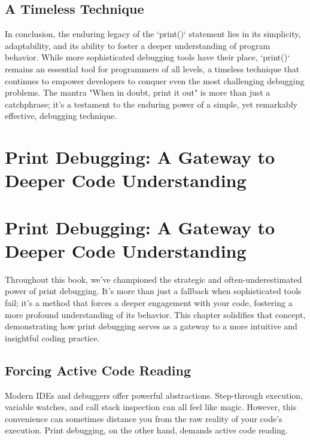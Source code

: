 \documentclass{article}
\begin{document}
{{{{\subsection*{A Timeless Technique}

In conclusion, the enduring legacy of the `print()` statement lies in its simplicity, adaptability, and its ability to foster a deeper understanding of program behavior. While more sophisticated debugging tools have their place, `print()` remains an essential tool for programmers of all levels, a timeless technique that continues to empower developers to conquer even the most challenging debugging problems. The mantra "When in doubt, print it out" is more than just a catchphrase; it's a testament to the enduring power of a simple, yet remarkably effective, debugging technique.

\newpage

\section*{Print Debugging: A Gateway to Deeper Code Understanding} %
\label{chapter-10-2-Print_Debugging__A_Gateway_to_Deeper_Cod}

\section*{Print Debugging: A Gateway to Deeper Code Understanding}

Throughout this book, we've championed the strategic and often-underestimated power of print debugging. It's more than just a fallback when sophisticated tools fail; it's a method that forces a deeper engagement with your code, fostering a more profound understanding of its behavior. This chapter solidifies that concept, demonstrating how print debugging serves as a gateway to a more intuitive and insightful coding practice.

\subsection*{Forcing Active Code Reading}

Modern IDEs and debuggers offer powerful abstractions. Step-through execution, variable watches, and call stack inspection can all feel like magic. However, this convenience can sometimes distance you from the raw reality of your code's execution. Print debugging, on the other hand, demands active code reading.

}}}}
\end{document}
